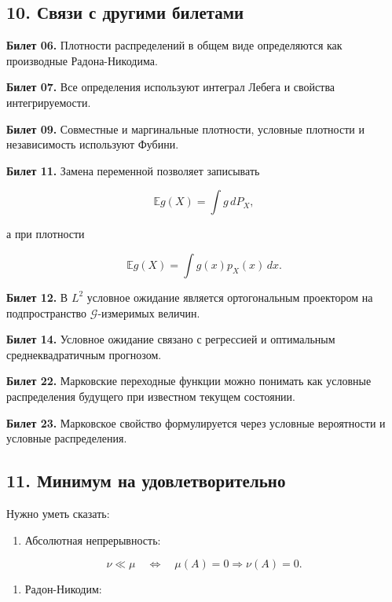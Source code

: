 \documentclass[
  11pt,
  a4paper,
]{article}
\providecommand{\tightlist}{%
  \setlength{\itemsep}{0pt}\setlength{\parskip}{0pt}}
\begin{document}
\subsection{10. Связи с другими
билетами}\label{ux441ux432ux44fux437ux438-ux441-ux434ux440ux443ux433ux438ux43cux438-ux431ux438ux43bux435ux442ux430ux43cux438}

\textbf{Билет 06.} Плотности распределений в общем виде определяются как
производные Радона-Никодима.

\textbf{Билет 07.} Все определения используют интеграл Лебега и свойства
интегрируемости.

\textbf{Билет 09.} Совместные и маргинальные плотности, условные
плотности и независимость используют Фубини.

\textbf{Билет 11.} Замена переменной позволяет записывать

\[
\mathbb E g(X)=\int g\,dP_X,
\]

а при плотности

\[
\mathbb E g(X)=\int g(x)p_X(x)\,dx.
\]

\textbf{Билет 12.} В \(L^2\) условное ожидание является ортогональным
проектором на подпространство \(\mathcal G\)-измеримых величин.

\textbf{Билет 14.} Условное ожидание связано с регрессией и оптимальным
среднеквадратичным прогнозом.

\textbf{Билет 22.} Марковские переходные функции можно понимать как
условные распределения будущего при известном текущем состоянии.

\textbf{Билет 23.} Марковское свойство формулируется через условные
вероятности и условные распределения.

\subsection{11. Минимум на
удовлетворительно}\label{ux43cux438ux43dux438ux43cux443ux43c-ux43dux430-ux443ux434ux43eux432ux43bux435ux442ux432ux43eux440ux438ux442ux435ux43bux44cux43dux43e}

Нужно уметь сказать:

\begin{enumerate}
\def\labelenumi{\arabic{enumi}.}
\tightlist
\item
  Абсолютная непрерывность:
\end{enumerate}

\[
\nu\ll\mu
\quad\Longleftrightarrow\quad
\mu(A)=0\Rightarrow\nu(A)=0.
\]

\begin{enumerate}
\def\labelenumi{\arabic{enumi}.}
\setcounter{enumi}{1}
\tightlist
\item
  Радон-Никодим:
\end{enumerate}
\end{document}
